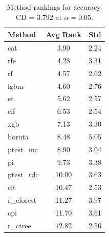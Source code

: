 \begin{table}[h]
\centering
\caption{Method rankings for accuracy. CD = 3.792 at $\alpha=0.05$.}
\label{tab:ranks_accuracy}
\begin{tabular}{lcc}
\toprule
Method & Avg Rank & Std \\
\midrule
cat & 3.90 & 2.24 \\
rfe & 4.28 & 3.31 \\
rf & 4.57 & 2.62 \\
lgbm & 4.60 & 2.76 \\
et & 5.62 & 2.57 \\
cif & 6.53 & 2.54 \\
xgb & 7.13 & 3.30 \\
boruta & 8.48 & 5.05 \\
ptest_mc & 8.90 & 3.04 \\
pi & 9.73 & 3.38 \\
ptest_rdc & 10.00 & 3.63 \\
cit & 10.47 & 2.53 \\
r_cforest & 11.27 & 3.97 \\
cpi & 11.70 & 3.61 \\
r_ctree & 12.82 & 2.56 \\
\bottomrule
\end{tabular}
\end{table}